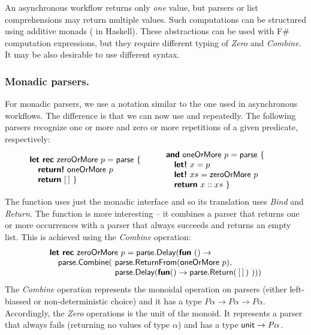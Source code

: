 \documentclass[runningheads,a4paper]{llncs}
\begin{document}
An asynchronous workflow returns only \emph{one} value, but parsers or list comprehensions may return 
multiple values. Such computations can be structured using additive monads ( in 
Haskell). These abstractions can be used with F\# computation expressions, but they require different
typing of \emph{Zero} and \emph{Combine}. It may be also desirable to use different syntax.

\vspace{-1em}
\subsubsection{Monadic parsers.} For monadic parsers, we use a notation similar to the one used in
asynchronous workflows. The difference is that we can now use  and  
repeatedly. The following parsers recognize one or more and zero or more repetitions of a given
predicate, respectively:
%
\vspace{-0.5em}\begin{equation*}
\hspace{-2em} \begin{array}{l}
\kvd{let rec}~\ident{zeroOrMore}~p = \ident{parse}~\{\\
\quad \kvd{return!}~\ident{oneOrMore}~p\\
\quad \kvd{return}~[\,] ~\}
\end{array}
\qquad
\begin{array}{l}
\kvd{and}~\ident{oneOrMore}~p = \ident{parse}~\{\\
\quad \kvd{let!}~x=p\\
\quad \kvd{let!}~xs = \ident{zeroOrMore}~p\\
\quad \kvd{return}~x::xs ~\}
\end{array}
\vspace{-0.5em}
\end{equation*}
%
The  function uses just the monadic interface and so its translation uses 
\emph{Bind} and \emph{Return}. The  function is more interesting -- it combines
a parser that returns one or more occurrences with a parser that always succeeds and returns an empty 
list. This is achieved using the \emph{Combine} operation:
%
\begin{equation*}
\begin{array}{l}
\kvd{let rec}~\ident{zeroOrMore}~p = \ident{parse}.\ident{Delay}(\kvd{fun}~()\rightarrow \\
\quad \ident{parse}.\ident{Combine}(~\ident{parse}.\ident{ReturnFrom}(\ident{oneOrMore}~p), \\
\hspace{7.8em} \ident{parse}.\ident{Delay}(\kvd{fun} () \rightarrow \ident{parse}.\ident{Return}(\,[\,]\,)~)))
\end{array}
\end{equation*}
%
The \emph{Combine} operation represents the monoidal operation on parsers (either left-biassed or
non-deterministic choice) and it has a type $P\alpha \rightarrow P\alpha \rightarrow P\alpha$. Accordingly,
the \emph{Zero} operations is the unit of the monoid. It represents a parser that always fails (returning
no values of type $\alpha$) and has a type $\textnormal{\sffamily unit}\rightarrow P\alpha$.
\end{document}
